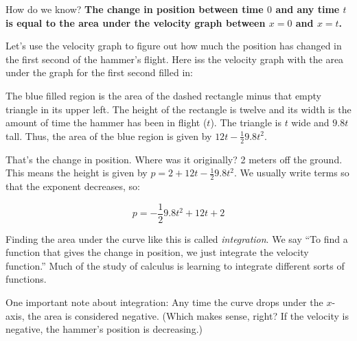 How do we know? \textbf{The change in position between time
  $0$ and any time $t$ is equal to the area under the velocity graph
  between $x = 0$ and $x = t$.}

Let's use the velocity graph to figure out how much the position has
changed in the first second of the hammer's flight. Here iss the
velocity graph with the area under the graph for the first second filled
in:



The blue filled region is the area of the dashed rectangle minus that
empty triangle in its upper left.  The height of the rectangle is
twelve and its width is the amount of time the hammer has been in
flight ($t$). The triangle is $t$ wide and $9.8t$ tall. Thus, the
area of the blue region is given by $12t - \frac{1}{2}9.8 t^2$.

That's the change in position. Where was it originally? 2 meters off
the ground. This means the height is given by $p = 2 + 12t - \frac{1}{2}9.8t^2$.
We usually write terms so that the exponent decreases, so:

$$p = - \frac{1}{2}9.8t^2 + 12t + 2$$

Finding the area under the curve like this is called
\textit{integration}. We say ``To find a function that gives the
change in position, we just integrate the velocity function.''  Much
of the study of calculus is learning to integrate different sorts of
functions.

One important note about integration: Any time the curve drops under
the $x$-axis, the area is considered negative. (Which makes sense,
right? If the velocity is negative, the hammer's position is
decreasing.)


